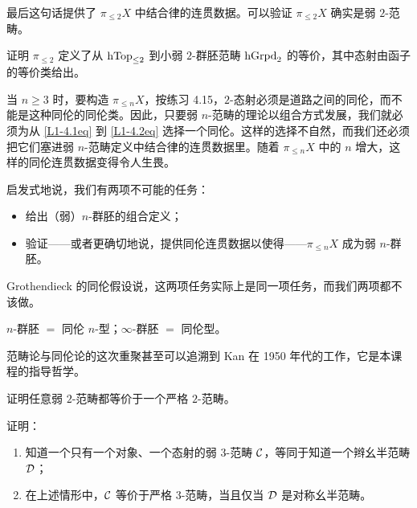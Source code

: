 最后这句话提供了 $\pi_{\le 2}X$ 中结合律的连贯数据。可以验证 $\pi_{\le 2}X$ 确实是弱 $2$-范畴。

\begin{challenge}\label{L1-4.17}
证明 $\pi_{\le 2}$ 定义了从 $\operatorname{hTop}_{\le 2}$ 到小弱 $2$-群胚范畴 $\operatorname{hGrpd}_2$ 的等价，其中态射由函子的等价类给出。
\end{challenge}

\nitem\label{L1-4.18} 当 $n\ge 3$ 时，要构造 $\pi_{\le n}X$，按练习 4.15，$2$-态射必须是道路之间的同伦，而不能是这种同伦的同伦类。因此，只要弱 $n$-范畴的理论以组合方式发展，我们就必须为从 \eqref{L1-4.1eq} 到 \eqref{L1-4.2eq} 选择一个同伦。这样的选择不自然，而我们还必须把它们塞进弱 $n$-范畴定义中结合律的连贯数据里。随着 $\pi_{\le n}X$ 中的 $n$ 增大，这样的同伦连贯数据变得令人生畏。

\nitem\label{L1-4.19} 启发式地说，我们有两项不可能的任务：
\begin{itemize}[leftmargin=2.2em,itemsep=0.1em]
\item 给出（弱）$n$-群胚的组合定义；
\item 验证——或者更确切地说，提供同伦连贯数据以使得——$\pi_{\le n}X$ 成为弱 $n$-群胚。
\end{itemize}
Grothendieck 的同伦假设说，这两项任务实际上是同一项任务，而我们两项都不该做。

\begin{slogan}\label{L1-4.20}\centering\par
$n$-群胚 $=$ 同伦 $n$-型；\qquad $\infty$-群胚 $=$ 同伦型。
\end{slogan}

\nitem\label{L1-4.21} 范畴论与同伦论的这次重聚甚至可以追溯到 Kan 在 1950 年代的工作，它是本课程的指导哲学。


\begin{exercise}\label{L1-A.1}
证明任意弱 $2$-范畴都等价于一个严格 $2$-范畴。
\end{exercise}

\begin{exercise}\label{L1-A.2}
证明：
\begin{enumerate}[label=(\arabic*),leftmargin=2.4em,itemsep=0.1em]
\item 知道一个只有一个对象、一个态射的弱 $3$-范畴 $\mathcal{C}$，等同于知道一个辫幺半范畴 $\mathcal{D}$；
\item 在上述情形中，$\mathcal{C}$ 等价于严格 $3$-范畴，当且仅当 $\mathcal{D}$ 是对称幺半范畴。
\end{enumerate}
\end{exercise}

